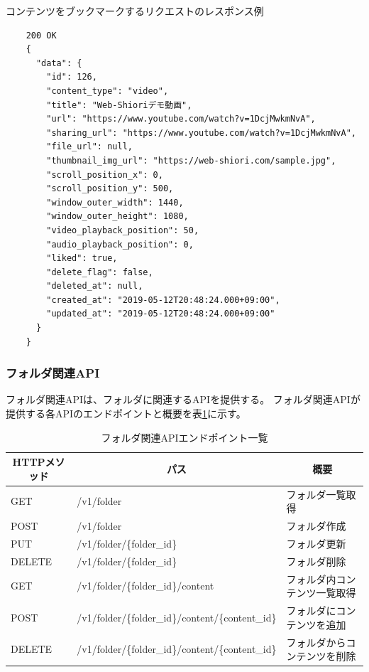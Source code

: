 \begin{itembox}[l]{コンテンツをブックマークするリクエストのレスポンス例}
  \label{content-response-json}
  \begin{verbatim}
    200 OK
    {
      "data": {
        "id": 126,
        "content_type": "video",
        "title": "Web-Shioriデモ動画",
        "url": "https://www.youtube.com/watch?v=1DcjMwkmNvA",
        "sharing_url": "https://www.youtube.com/watch?v=1DcjMwkmNvA",
        "file_url": null,
        "thumbnail_img_url": "https://web-shiori.com/sample.jpg",
        "scroll_position_x": 0,
        "scroll_position_y": 500,
        "window_outer_width": 1440,
        "window_outer_height": 1080,
        "video_playback_position": 50,
        "audio_playback_position": 0,
        "liked": true,
        "delete_flag": false,
        "deleted_at": null,
        "created_at": "2019-05-12T20:48:24.000+09:00",
        "updated_at": "2019-05-12T20:48:24.000+09:00"
      }
    }
  \end{verbatim}
\end{itembox}

\subsubsection{フォルダ関連API}
フォルダ関連APIは、フォルダに関連するAPIを提供する。
フォルダ関連APIが提供する各APIのエンドポイントと概要を表\ref{tb:design-folder-api}に示す。

\begin{table}[htbp]
  \label{tb:design-folder-api}
  \caption{フォルダ関連APIエンドポイント一覧}
  \begin{center}
    \begin{tabular}{|l|l|l|}
      \hline
      \multicolumn{1}{|c|}{\textbf{HTTPメソッド}} & \multicolumn{1}{|c|}{\textbf{パス}} & \multicolumn{1}{|c|}{\textbf{概要}} \\\hline
      GET & /v1/folder & フォルダ一覧取得 \\\hline
      POST & /v1/folder & フォルダ作成 \\\hline
      PUT & /v1/folder/\{folder\_id\} & フォルダ更新 \\\hline
      DELETE & /v1/folder/\{folder\_id\} & フォルダ削除 \\\hline
      GET & /v1/folder/\{folder\_id\}/content & フォルダ内コンテンツ一覧取得 \\\hline
      POST & /v1/folder/\{folder\_id\}/content/\{content\_id\} & フォルダにコンテンツを追加 \\\hline
      DELETE & /v1/folder/\{folder\_id\}/content/\{content\_id\} & フォルダからコンテンツを削除 \\\hline
    \end{tabular}
  \end{center}
\end{table}

